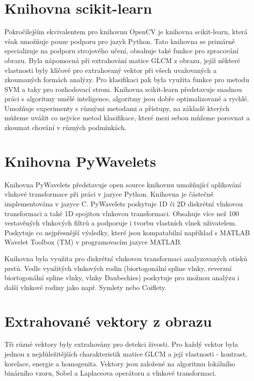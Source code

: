 \section{Knihovna scikit-learn}
Pokročilejším ekvivalentem pro knihovnu OpenCV je knihovna scikit-learn, která však umožňuje pouze podporu pro jazyk Python. Tato knihovna se primárně specializuje na podporu strojového učení, obsahuje také funkce pro zpracování obrazu. Byla nápomocná při extrahování matice GLCM z obrazu, jejíž některé vlastnosti byly klíčové pro extrahovaný vektor při všech uvažovaných a zkoumaných formách analýzy. Pro klasifikaci pak byla využita funkce pro metodu SVM a taky pro rozhodovací strom. Knihovna scikit-learn představuje snadnou práci s algoritmy umělé inteligence, algoritmy jsou dobře optimalizované a rychlé. Umožňuje experimenty s různými metodami a přístupy, na základě kterých můžeme uvážit co nejvíce metod klasifikace, které mezi sebou můžeme porovnat a zkoumat chování v různých podmínkách.

\section{Knihovna PyWavelets}
Knihovna PyWavelets představuje open source knihovnu umožňující aplikování vlnkové transformace při práci v jazyce Python. Knihovna je částečně implementována v jazyce C. PyWavelets poskytuje 1D či 2D diskrétní vlnkovou transformaci a také 1D spojitou vlnkovou transformaci. Obsahuje více než 100 vestavěných vlnkových filtrů a podporuje i tvorbu vlastních vlnek uživatelem. Poskytuje co nejpřesnější výsledky, které jsou kompatabilní například s MATLAB Wavelet Toolbox (TM) v programovacím jazyce MATLAB.

Knihovna byla využita pro diskrétní vlnkovou transformaci analyzovaných otisků prstů. Vedle využitých vlnkových rodin (biortogonální spline vlnky, reverzní biortogonální spline vlnky, vlnky Daubechies) poskytuje pro možnou analýzu i další vlnkové rodiny jako např. Symlety nebo Coiflety. \cite{PywtAbout}

\section{Extrahované vektory z obrazu}
Tři různé vektory byly extrahovány pro detekci živosti. Pro každý vektor byla jednou z nejdůležitějších charakteristik matice GLCM a její vlastnosti - kontrast, korelace, energie a homogenita. Vektory jsou založené na algoritmu lokálního binárního vzoru, Sobel a Laplaceova operátoru a vlnkové transformaci.

